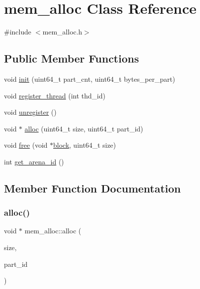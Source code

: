 \hypertarget{classmem__alloc}{}\section{mem\+\_\+alloc Class Reference}
\label{classmem__alloc}


{\ttfamily \#include $<$mem\+\_\+alloc.\+h$>$}

\subsection*{Public Member Functions}
\begin{DoxyCompactItemize}
\item 
void \hyperlink{classmem__alloc_aeceb681eed3f07c1395160ee3379dd09}{init} (uint64\+\_\+t part\+\_\+cnt, uint64\+\_\+t bytes\+\_\+per\+\_\+part)
\item 
void \hyperlink{classmem__alloc_a19fffc69eae74964aa8f4953b0d511aa}{register\+\_\+thread} (int thd\+\_\+id)
\item 
void \hyperlink{classmem__alloc_a870a6fc38edd0ca50d4ef29d1b7014b9}{unregister} ()
\item 
void $\ast$ \hyperlink{classmem__alloc_af41385dd4ab067a79a93635e3518e6af}{alloc} (uint64\+\_\+t size, uint64\+\_\+t part\+\_\+id)
\item 
void \hyperlink{classmem__alloc_a619ab09bd3556867df9e1a9ad88704fb}{free} (void $\ast$\hyperlink{classblock}{block}, uint64\+\_\+t size)
\item 
int \hyperlink{classmem__alloc_a5b5abeba7076849012e879e417eecca4}{get\+\_\+arena\+\_\+id} ()
\end{DoxyCompactItemize}


\subsection{Member Function Documentation}
\mbox{\label{classmem__alloc_af41385dd4ab067a79a93635e3518e6af}} 
\subsubsection{\texorpdfstring{alloc()}{alloc()}}
{\footnotesize\ttfamily void $\ast$ mem\+\_\+alloc\+::alloc (\begin{DoxyParamCaption}\item[{uint64\+\_\+t}]{size,  }\item[{uint64\+\_\+t}]{part\+\_\+id }\end{DoxyParamCaption})}

